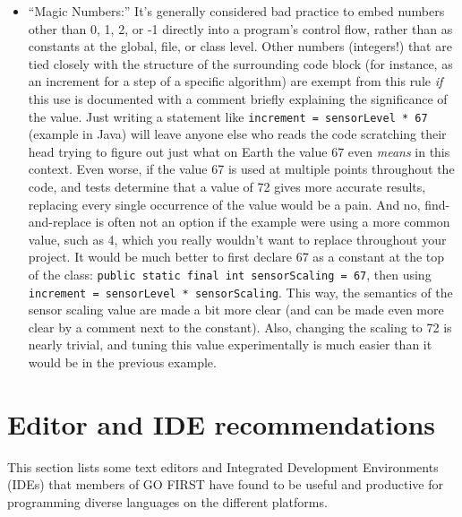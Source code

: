 \documentclass[12pt]{article}
\newcommand{\code}[1]{\texttt{#1}}
\begin{document}
\begin{itemize}
    \item ``Magic Numbers:'' It's generally considered bad practice to embed numbers other than 0, 1, 2, or -1 directly into a program's control flow, rather than as constants at the global, file, or class level. Other numbers (integers!) that are tied closely with the structure of the surrounding code block (for instance, as an increment for a step of a specific algorithm) are exempt from this rule \emph{if} this use is documented with a comment briefly explaining the significance of the value. Just writing a statement like \code{increment = sensorLevel * 67} (example in Java) will leave anyone else who reads the code scratching their head trying to figure out just what on Earth the value 67 even \emph{means} in this context. Even worse, if the value 67 is used at multiple points throughout the code, and tests determine that a value of 72 gives more accurate results, replacing every single occurrence of the value would be a pain. And no, find-and-replace is often not an option if the example were using a more common value, such as 4, which you really wouldn't want to replace throughout your project. It would be much better to first declare 67 as a constant at the top of the class: \code{public static final int sensorScaling = 67}, then using \code{increment = sensorLevel * sensorScaling}. This way, the semantics of the sensor scaling value are made a bit more clear (and can be made even more clear by a comment next to the constant). Also, changing the scaling to 72 is nearly trivial, and tuning this value experimentally is much easier than it would be in the previous example.
\end{itemize}

\appendix
\section{Editor and IDE recommendations}
\label{sec:editors}
This section lists some text editors and Integrated Development Environments (IDEs) that members of GO FIRST have found to be useful and productive for programming diverse languages on the different platforms.
\end{document}
